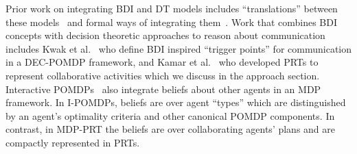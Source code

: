 

Prior work on integrating BDI and DT models includes ``translations'' between these models~\cite{simari2006relationship,schut2002partially} and formal ways of integrating them~\cite{maheswaran2004adjustable,nair2003integrating}.  Work that combines BDI concepts with decision theoretic approaches to reason about communication includes Kwak et al.~ who define BDI inspired ``trigger points'' for communication in a DEC-POMDP framework, and Kamar et al.~ who developed PRTs to represent collaborative activities which we discuss in the approach section.  Interactive POMDPs~\cite{gmytrasiewicz2005framework} also integrate beliefs about other agents in an MDP framework.
 In I-POMDPs, beliefs are over agent ``types'' which are distinguished by an agent's optimality criteria and other canonical POMDP components.  In contrast, in MDP-PRT the beliefs are over collaborating agents' plans and are compactly represented in PRTs. 





